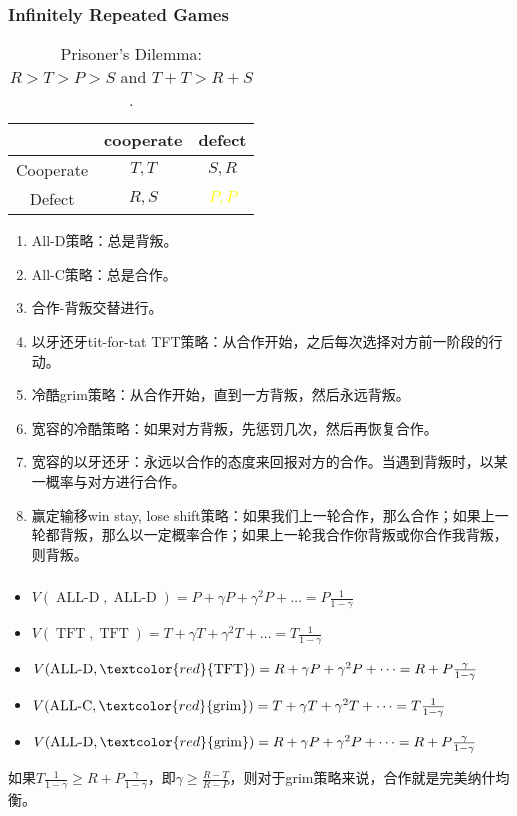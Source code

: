 \documentclass[UTF8,11pt,colorlinks,compress,openany]{beamer}%
\begin{document}
\begin{frame}\frametitle{Infinitely Repeated Games}
\begin{table}
\begin{tabu}{c|cc}
\hline
 & cooperate & defect\\
\hline
Cooperate & $T,T$ & $S,R$\\
Defect & $R,S$ &\textcolor{yellow}{$P,P$}\\
\hline
\end{tabu}\caption{Prisoner's Dilemma: $R>T>P>S$ and $T+T > R+S$.}
\end{table}
\begin{enumerate}
	\item All-D策略：总是背叛。
	\item All-C策略：总是合作。
	\item 合作-背叛交替进行。
	\item 以牙还牙tit-for-tat TFT策略：从合作开始，之后每次选择对方前一阶段的行动。
	\item 冷酷grim策略：从合作开始，直到一方背叛，然后永远背叛。
	\item 宽容的冷酷策略：如果对方背叛，先惩罚几次，然后再恢复合作。
	\item 宽容的以牙还牙：永远以合作的态度来回报对方的合作。当遇到背叛时，以某一概率与对方进行合作。
	\item 赢定输移win stay, lose shift策略：如果我们上一轮合作，那么合作；如果上一轮都背叛，那么以一定概率合作；如果上一轮我合作你背叛或你合作我背叛，则背叛。
\end{enumerate}
\end{frame}

\begin{frame}\frametitle{}
\begin{itemize}
	\item $V(\operatorname{ALL-D},\operatorname{ALL-D})=P+\gamma P+\gamma^2 P+\dots=P\frac{1}{1-\gamma}$
	\item $V(\operatorname{TFT},\operatorname{TFT})=T+\gamma T+\gamma^2 T+\dots=T\frac{1}{1-\gamma}$
	\item $V(\operatorname{ALL-D},\textcolor{red}{\operatorname{TFT}})=R+\gamma P+\gamma^2 P+\dots=R+P\frac{\gamma}{1-\gamma}$
	\item $V(\operatorname{ALL-C},\textcolor{red}{\operatorname{grim}})=T+\gamma T+\gamma^2 T+\dots=T\frac{1}{1-\gamma}$
	\item $V(\operatorname{ALL-D},\textcolor{red}{\operatorname{grim}})=R+\gamma P+\gamma^2 P+\dots=R+P\frac{\gamma}{1-\gamma}$
\end{itemize}
如果$T\frac{1}{1-\gamma}\geq R+P\frac{\gamma}{1-\gamma}$，即$\gamma\geq\frac{R-T}{R-P}$，则对于grim策略来说，合作就是完美纳什均衡。
\end{frame}
\end{document}
